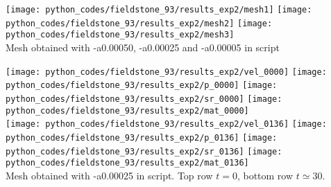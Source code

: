 \begin{center}
\texttt{[image: python\_codes/fieldstone\_93/results\_exp2/mesh1]}
\texttt{[image: python\_codes/fieldstone\_93/results\_exp2/mesh2]}
\texttt{[image: python\_codes/fieldstone\_93/results\_exp2/mesh3]}\\
{\captionfont  Mesh obtained with -a0.00050, -a0.00025 and -a0.00005 in script}
\end{center}

\begin{center}
\texttt{[image: python\_codes/fieldstone\_93/results\_exp2/vel\_0000]}
\texttt{[image: python\_codes/fieldstone\_93/results\_exp2/p\_0000]}
\texttt{[image: python\_codes/fieldstone\_93/results\_exp2/sr\_0000]}
\texttt{[image: python\_codes/fieldstone\_93/results\_exp2/mat\_0000]}\\
\texttt{[image: python\_codes/fieldstone\_93/results\_exp2/vel\_0136]}
\texttt{[image: python\_codes/fieldstone\_93/results\_exp2/p\_0136]}
\texttt{[image: python\_codes/fieldstone\_93/results\_exp2/sr\_0136]}
\texttt{[image: python\_codes/fieldstone\_93/results\_exp2/mat\_0136]}\\
{\captionfont  Mesh obtained with -a0.00025 in script. Top row $t=0$, 
bottom row $t\simeq 30$.}
\end{center}


\newpage

